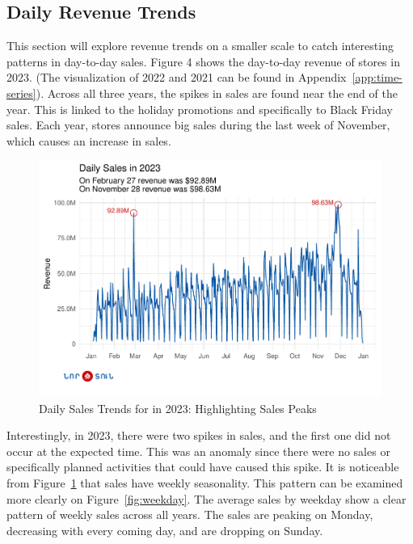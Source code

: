\documentclass[conference]{IEEEtran}
\begin{document}
\subsection{Daily Revenue Trends}
This section will explore revenue trends on a smaller scale to catch interesting patterns in day-to-day sales. Figure 4 shows the day-to-day revenue of stores in 2023. (The visualization of 2022 and 2021 can be found in Appendix~\autoref{app:time-series}). Across all three years, the spikes in sales are found near the end of the year. This is linked to the holiday promotions and specifically to Black Friday sales. Each year, stores announce big sales during the last week of November, which causes an increase in sales. 
\begin{figure}[htbp]
\centering
\includegraphics[width=\columnwidth,keepaspectratio]{./figures/time_series_2023_sales.pdf}
\caption{Daily Sales Trends for in 2023: Highlighting Sales Peaks \cite{TSF}}
\label{fig:time-series-2023}
\end{figure}
Interestingly, in 2023, there were two spikes in sales, and the first one did not occur at the expected time. This was an anomaly since there were no sales or specifically planned activities that could have caused this spike. It is noticeable from Figure~\ref{fig:time-series-2023} that sales have weekly seasonality. This pattern can be examined more clearly on Figure~\ref{fig:weekday}. The average sales by weekday show a clear pattern of weekly sales across all years. The sales are peaking on Monday, decreasing with every coming day, and are dropping on Sunday.
\end{document}

